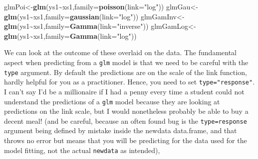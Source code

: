 \documentclass[
]{book}
\newenvironment{Shaded}{\begin{snugshade}}{\end{snugshade}}
\newcommand{\AttributeTok}[1]{\textcolor[rgb]{0.13,0.29,0.53}{#1}}
\newcommand{\FunctionTok}[1]{\textcolor[rgb]{0.13,0.29,0.53}{\textbf{#1}}}
\newcommand{\NormalTok}[1]{#1}
\newcommand{\OtherTok}[1]{\textcolor[rgb]{0.56,0.35,0.01}{#1}}
\newcommand{\SpecialCharTok}[1]{\textcolor[rgb]{0.81,0.36,0.00}{\textbf{#1}}}
\newcommand{\StringTok}[1]{\textcolor[rgb]{0.31,0.60,0.02}{#1}}
\begin{document}
\begin{Shaded}
\begin{Highlighting}[]
\NormalTok{glmPoi}\OtherTok{\textless{}{-}}\FunctionTok{glm}\NormalTok{(ys1}\SpecialCharTok{\textasciitilde{}}\NormalTok{xs1,}\AttributeTok{family=}\FunctionTok{poisson}\NormalTok{(}\AttributeTok{link=}\StringTok{"log"}\NormalTok{))}
\NormalTok{glmGau}\OtherTok{\textless{}{-}}\FunctionTok{glm}\NormalTok{(ys1}\SpecialCharTok{\textasciitilde{}}\NormalTok{xs1,}\AttributeTok{family=}\FunctionTok{gaussian}\NormalTok{(}\AttributeTok{link=}\StringTok{"log"}\NormalTok{))}
\NormalTok{glmGamInv}\OtherTok{\textless{}{-}}\FunctionTok{glm}\NormalTok{(ys1}\SpecialCharTok{\textasciitilde{}}\NormalTok{xs1,}\AttributeTok{family=}\FunctionTok{Gamma}\NormalTok{(}\AttributeTok{link=}\StringTok{"inverse"}\NormalTok{))}
\NormalTok{glmGamLog}\OtherTok{\textless{}{-}}\FunctionTok{glm}\NormalTok{(ys1}\SpecialCharTok{\textasciitilde{}}\NormalTok{xs1,}\AttributeTok{family=}\FunctionTok{Gamma}\NormalTok{(}\AttributeTok{link=}\StringTok{"log"}\NormalTok{))}
\end{Highlighting}
\end{Shaded}

We can look at the outcome of these overlaid on the data. The fundamental aspect when predicting from a \texttt{glm} model is that we need to be careful with the \texttt{type} argument. By default the predictions are on the scale of the link function, hardly helpful for you as a practitioner. Hence, you need to set \texttt{type="response"}. I can't say I'd be a millionaire if I had a penny every time a student could not understand the predictions of a \texttt{glm} model because they are looking at predictions on the link scale, but I would nonetheless probably be able to buy a decent meal! (and be careful, because an often found bug is the \texttt{type=response} argument being defined by mistake inside the newdata data.frame, and that throws no error but means that you will be predicting for the data used for the model fitting, not the actual \texttt{newdata} as intended),
\end{document}

